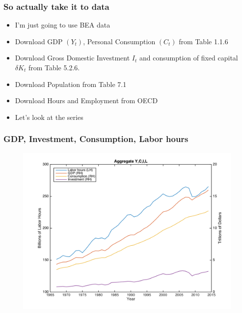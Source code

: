 \documentclass{beamer}
\begin{document}
\begin{frame}
\frametitle[alignment=center]{So actually take it to data}
\begin{itemize}
\item I'm just going to use BEA data
\bigskip
\item Download GDP $(Y_t)$, Personal Consumption $(C_t)$ from Table 1.1.6
\bigskip
\item Download Gross Domestic Investment $I_t$ and consumption of fixed capital $\delta K_t$ from Table 5.2.6.
\bigskip
\item Download Population from Table 7.1
\bigskip
\item Download Hours and Employment from OECD
\bigskip
\item Let's look at the series
\end{itemize}
\end{frame}

\begin{frame}
\frametitle[alignment=center]{GDP, Investment, Consumption, Labor hours}
\begin{figure}
\centering
\includegraphics[scale=0.5]{Figure_1.png}
\end{figure}
\end{frame}
\end{document}
